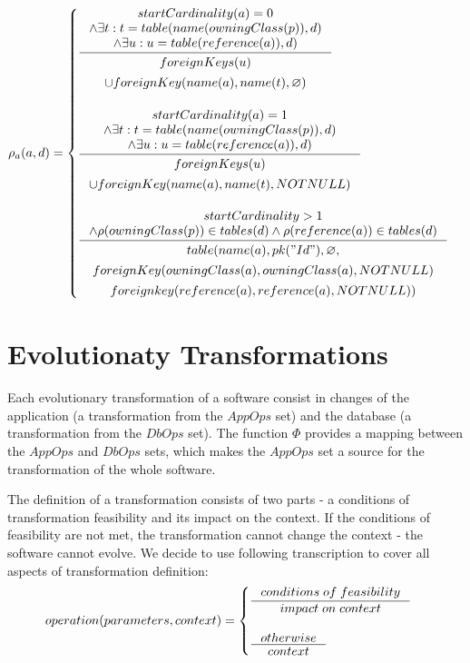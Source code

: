 \documentclass[11pt]{article}
\begin{document}
$
\rho_a(a,d) = \begin{cases}
 \inference{ startCardinality(a) = 0 \\ \wedge \exists t : t = table(name(owningClass(p)), d) \\ \wedge \exists u : u = table(reference(a)), d)}{ 
 \begin{gathered}
 foreignKeys(u) \\ \cup foreignKey(name(a), name(t),  \varnothing) 
 \end{gathered}
 }
  \\ \\
 \inference{ startCardinality(a) = 1 \\ \wedge \exists t : t = table(name(owningClass(p)), d) \\ \wedge \exists u : u = table(reference(a)), d)}{\begin{gathered}  
foreignKeys(u) \\ \cup  foreignKey(name(a), name(t),  NOTNULL) \\
\end{gathered}
} \\ \\
 
  \inference{  startCardinality > 1 \\ \wedge \rho(owningClass(p)) \in tables(d) \wedge \rho(reference(a)) \in tables(d)}{
  \begin{gathered}  
 table(name(a), pk("Id"), \varnothing, \\ foreignKey(owningClass(a),owningClass(a), NOTNULL) \\ foreignkey(reference(a), reference(a), NOTNULL)) 
  \end{gathered}}  
 \end{cases}
$

\section{Evolutionaty Transformations}
Each evolutionary transformation of a software consist in changes of the application (a transformation from the $AppOps$ set) and the database (a transformation from the  $DbOps$ set). The function $\Phi$ provides a mapping between the $AppOps$ and $DbOps$ sets, which makes the $AppOps$ set a source for the transformation of the whole software.

The definition of a transformation consists of two parts - a conditions of transformation feasibility and its impact on the context. If the conditions of feasibility are not met, the transformation cannot change the context - the software cannot evolve.  We decide to use following transcription to cover all aspects  of transformation definition:
\begin{gather*}
operation(parameters, context) = \begin{cases}
  \inference{conditions \; of \; feasibility}{impact \; on \; context}\\ \\
  \inference{otherwise}{context}
 \end{cases}
\end{gather*}
\end{document}
